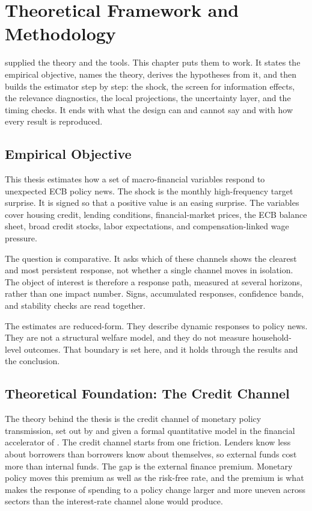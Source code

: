 \chapter{Theoretical Framework and Methodology}
\label{chap:theory}
\label{chap:methodology}

 supplied the theory and the tools. This chapter puts them to work. It states the empirical objective, names the theory, derives the hypotheses from it, and then builds the estimator step by step: the shock, the screen for information effects, the relevance diagnostics, the local projections, the uncertainty layer, and the timing checks. It ends with what the design can and cannot say and with how every result is reproduced.

\section{Empirical Objective}

This thesis estimates how a set of macro-financial variables respond to unexpected ECB policy news. The shock is the monthly high-frequency target surprise. It is signed so that a positive value is an easing surprise. The variables cover housing credit, lending conditions, financial-market prices, the ECB balance sheet, broad credit stocks, labor expectations, and compensation-linked wage pressure.

The question is comparative. It asks which of these channels shows the clearest and most persistent response, not whether a single channel moves in isolation. The object of interest is therefore a response path, measured at several horizons, rather than one impact number. Signs, accumulated responses, confidence bands, and stability checks are read together.

The estimates are reduced-form. They describe dynamic responses to policy news. They are not a structural welfare model, and they do not measure household-level outcomes. That boundary is set here, and it holds through the results and the conclusion.

\section{Theoretical Foundation: The Credit Channel}
\label{sec:credit-channel-theory}

The theory behind the thesis is the credit channel of monetary policy transmission, set out by \textcite{BernankeGertler1995} and given a formal quantitative model in the financial accelerator of \textcite{BernankeGertlerGilchrist1999}. The credit channel starts from one friction. Lenders know less about borrowers than borrowers know about themselves, so external funds cost more than internal funds. The gap is the external finance premium. Monetary policy moves this premium as well as the risk-free rate, and the premium is what makes the response of spending to a policy change larger and more uneven across sectors than the interest-rate channel alone would produce.

